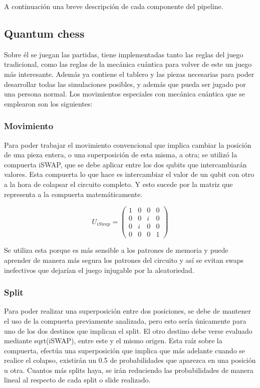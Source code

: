 A continuación una breve descripción de cada componente del pipeline.

\subsection{Quantum chess}

Sobre él se juegan las partidas, tiene implementadas tanto las reglas del juego tradicional, como las reglas de la mecánica cuántica para volver de este un juego más interesante. Además ya contiene el tablero y las piezas necesarias para poder desarrollar todas las simulaciones posibles, y además que pueda ser jugado por una persona normal.
Los movimientos especiales con mecánica cuántica que se emplearon son los siguientes:

\subsubsection{Movimiento}

Para poder trabajar el movimiento convencional que implica cambiar la posición de una pieza entera, o una superposición de esta misma, a otra; se utilizó la compuerta iSWAP, que se debe aplicar entre los dos qubits que intercambiarán valores.
Esta compuerta lo que hace es intercambiar el valor de un qubit con otro a la hora de colapsar el circuito completo. Y esto sucede por la matriz que representa a la compuerta matemáticamente.

\[
U_{iSwap} = \begin{pmatrix}
	1 & 0 & 0 & 0 \\
	0 & 0 & i & 0 \\
	0 & i & 0 & 0 \\
	0 & 0 & 0 & 1
\end{pmatrix}
\]

Se utiliza esta porque es más sensible a los patrones de memoria y puede aprender de manera más segura los patrones del circuito y así se evitan swaps inefectivos que dejarían el juego injugable por la aleatoriedad.

\subsubsection{Split} 

Para poder realizar una superposición entre dos posiciones, se debe de mantener el uso de la compuerta previamente analizada, pero esto sería únicamente para uno de los dos destinos que implican el split. El otro destino debe verse evaluado mediante sqrt(iSWAP), entre este y el mismo origen.
Esta raíz sobre la compuerta, efectúa una superposición que implica que más adelante cuando se realice el colapso, existirán un 0.5 de probabilidades que aparezca en una posición u otra. Cuantos más splits haya, se irán reduciendo las probabilidades de manera lineal al respecto de cada split o slide realizado.

